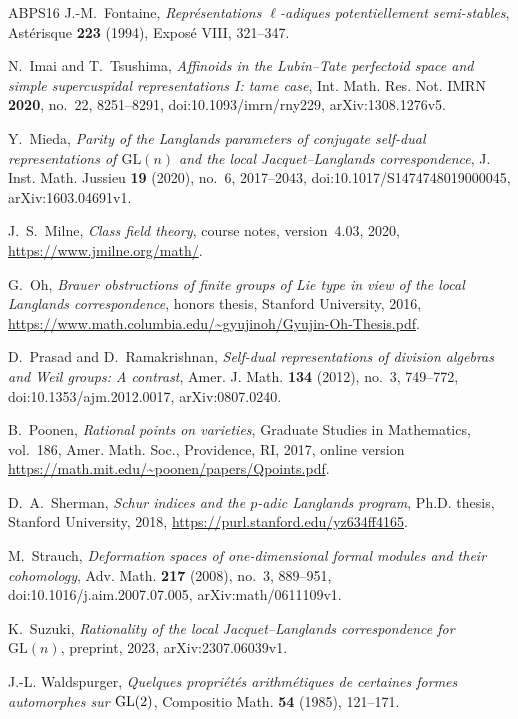 \documentclass[a4paper,11pt]{amsart}
\theoremstyle{definition}
\theoremstyle{remark}
\numberwithin{equation}{section}
\begin{document}
\begin{thebibliography}{ABPS16}
J.-M.~Fontaine, \emph{Repr\'esentations $\ell$-adiques potentiellement semi-stables}, Ast\'erisque \textbf{223} (1994), Expos\'e VIII, 321--347.

N.~Imai and T.~Tsushima, \emph{Affinoids in the {L}ubin--{T}ate perfectoid space and simple supercuspidal representations {I}: tame case}, Int. Math. Res. Not. IMRN \textbf{2020}, no.~22, 8251--8291, doi:10.1093/imrn/rny229, arXiv:1308.1276v5.

Y.~Mieda, \emph{Parity of the {L}anglands parameters of conjugate self-dual representations of $\mathrm{GL}(n)$ and the local {J}acquet--{L}anglands correspondence}, J. Inst. Math. Jussieu \textbf{19} (2020), no.~6, 2017--2043, doi:10.1017/S1474748019000045, arXiv:1603.04691v1.

J.~S.~Milne, \emph{Class field theory}, course notes, version~4.03, 2020, \url{https://www.jmilne.org/math/}.

G.~Oh, \emph{Brauer obstructions of finite groups of Lie type in view of the local Langlands correspondence}, honors thesis, Stanford University, 2016, \url{https://www.math.columbia.edu/~gyujinoh/Gyujin-Oh-Thesis.pdf}.

D.~Prasad and D.~Ramakrishnan, \emph{Self-dual representations of division algebras and {W}eil groups: {A} contrast}, Amer. J. Math. \textbf{134} (2012), no.~3, 749--772, doi:10.1353/ajm.2012.0017, arXiv:0807.0240.

B.~Poonen, \emph{Rational points on varieties}, Graduate Studies in Mathematics, vol.~186, Amer. Math. Soc., Providence, RI, 2017, online version \url{https://math.mit.edu/~poonen/papers/Qpoints.pdf}.

D.~A.~Sherman, \emph{Schur indices and the $p$-adic Langlands program}, Ph.D. thesis, Stanford University, 2018, \url{https://purl.stanford.edu/yz634ff4165}.

M.~Strauch, \emph{Deformation spaces of one-dimensional formal modules and their cohomology}, Adv. Math. \textbf{217} (2008), no.~3, 889--951, doi:10.1016/j.aim.2007.07.005, arXiv:math/0611109v1.

K.~Suzuki, \emph{Rationality of the local {J}acquet--{L}anglands correspondence for $\mathrm{GL}(n)$}, preprint, 2023, arXiv:2307.06039v1.

J.-L. Waldspurger, \emph{Quelques propri\'et\'es arithm\'etiques de certaines formes automorphes sur {${\rm GL}(2)$}}, Compositio Math. \textbf{54} (1985), 121--171.
\end{thebibliography}
\end{document}
